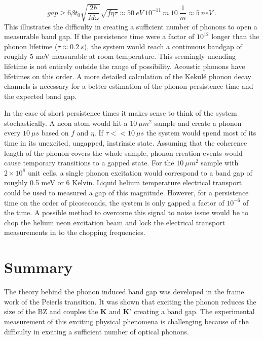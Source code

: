 \begin{equation*}
	gap \geq 6 \beta t_0 \sqrt{\frac{2 \hbar}{M \omega}}\sqrt{f \eta \tau} \approx 50 \ eV \ 10^{-11} \ m \ 10 \ \frac{1}{m}
	\approx 5 \ neV \ .
\end{equation*}
This illustrates the difficulty in creating a sufficient number of phonons to open a measurable band gap.
If the persistence time were a factor of $10^{12}$ longer than the phonon lifetime ($\tau \approx 0.2 \ s$), the system would reach a continuous bandgap of roughly 5 meV measurable at room temperature.
This seemingly unending lifetime is not entirely outside the range of possibility.
Acoustic phonons have lifetimes on this order.
A more detailed calculation of the Kekul\'e phonon decay channels is necessary for a better estimation of the phonon persistence time and the expected band gap.

In the case of short persistence times it makes sense to think of the system stochastically.
A neon atom would hit a $10 \ \mu m^2$ sample and create a phonon every $10 \ \mu s$ based on $f$ and $\eta$.
If $\tau << 10 \ \mu s$ the system would spend most of its time in its unexcited, ungapped, instrinsic state.
Assuming that the coherence length of the phonon covers the whole sample, phonon creation events would cause temporary transitions to a gapped state.
For the $10 \ \mu m^2$ sample with $2 \times 10^8$ unit cells, a single phonon excitation would correspond to a band gap of roughly 0.5 meV or 6 Kelvin.
Liquid helium temperature electrical transport could be used to measured a gap of this magnitude.
However, for a persistence time on the order of picoseconds, the system is only gapped a factor of $10^{-6}$ of the time.
A possible method to overcome this signal to noise issue would be to chop the helium neon excitation beam and lock the electrical transport measurements in to the chopping frequencies.

\section{Summary}
The theory behind the phonon induced band gap was developed in the frame work of the Peierls transition.
It was shown that exciting the phonon reduces the size of the BZ and couples the $\bm{K}$ and $\bm{K'}$ creating a band gap.
The experimental measurement of this exciting physical phenomena is challenging because of the difficulty in exciting a sufficient number of optical phonons.